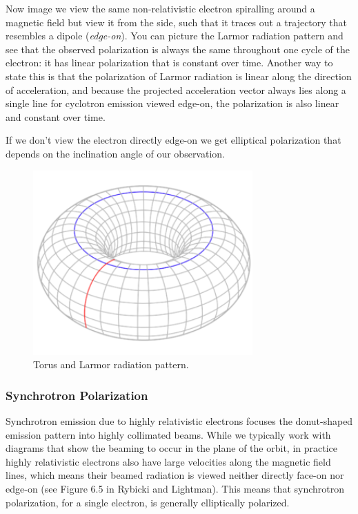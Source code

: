 \documentclass{article}
\begin{document}
Now image we view the same non-relativistic electron spiralling around a magnetic field but view it from the side, such that it traces out a trajectory that resembles a dipole (\emph{edge-on}). You can picture the Larmor radiation pattern and see that the observed polarization is always the same throughout one cycle of the electron: it has linear polarization that is constant over time. Another way to state this is that the polarization of Larmor radiation is linear along the direction of acceleration, and because the projected acceleration vector always lies along a single line for cyclotron emission viewed edge-on, the polarization is also linear and constant over time.

If we don't view the electron directly edge-on we get elliptical polarization that depends on the inclination angle of our observation.

\begin{figure}
    \centering
    \includegraphics[width=0.75\textwidth]{300px-Torus.png}
    \caption{Torus and Larmor radiation pattern.}
    \label{fig:Torus.}
\end{figure}

\subsubsection{Synchrotron Polarization}

Synchrotron emission due to highly relativistic electrons focuses the donut-shaped emission pattern into highly collimated beams. While we typically work with diagrams that show the beaming to occur in the plane of the orbit, in practice highly relativistic electrons also have large velocities along the magnetic field lines, which means their beamed radiation is viewed neither directly face-on nor edge-on (see Figure 6.5 in Rybicki and Lightman). This means that synchrotron polarization, for a single electron, is generally elliptically polarized.
\end{document}
